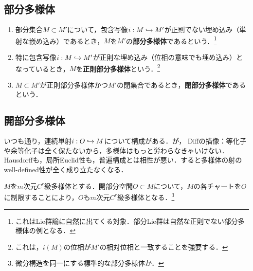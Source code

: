 \documentclass[uplatex,dvipdfmx]{jsreport}
\begin{document}
\subsection{部分多様体}

\begin{definition}\mbox{}
    \begin{enumerate}
        \item 部分集合$M\subset M'$について，包含写像$i:M\hookrightarrow M'$が正則でない埋め込み（単射な嵌め込み）であるとき，$M$を$M'$の\textbf{部分多様体}であるという．\footnote{これはLie群論に自然に出てくる対象．部分Lie群は自然な正則でない部分多様体の例となる．}
        \item 特に包含写像$i:M\hookrightarrow M'$が正則な埋め込み（位相の意味でも埋め込み）となっているとき，$M$を\textbf{正則部分多様体}という．\footnote{これは，$i(M)$の位相が$M'$の相対位相と一致することを強要する．}
        \item $M\subset M'$が正則部分多様体かつ$M'$の閉集合であるとき，\textbf{閉部分多様体}であるという．
    \end{enumerate}
\end{definition}

\subsection{開部分多様体}

\begin{tcolorbox}[colframe=ForestGreen, colback=ForestGreen!10!white,breakable,colbacktitle=ForestGreen!40!white,coltitle=black,fonttitle=\bfseries\sffamily,
    title=多様体という概念の微妙な均衡]
    いつも通り，連続単射$i:O\hookrightarrow M$について構成がある．が，
    Diffの描像：等化子や余等化子は全く保たないから，多様体はもっと労わらなきゃいけない．
    Hausdorffも，局所Euclid性も，普遍構成とは相性が悪い．すると多様体の射のwell-defined性が全く成り立たなくなる．
\end{tcolorbox}

\begin{lemma}
    $M$を$m$次元$C^r$級多様体とする．開部分空間$O\subset M$について，$M$の各チャートを$O$に制限することにより，$O$も$m$次元$C^r$級多様体となる．\footnote{微分構造を同一にする標準的な部分多様体か．}
\end{lemma}
\end{document}
